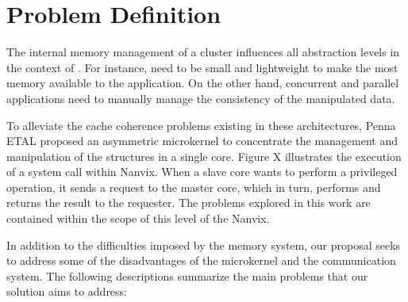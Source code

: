 \section{Problem Definition}
\label{sec:problem}

	The internal memory management of a cluster influences all abstraction
	levels in the context of \lws. For instance, \oses need to be small and
	lightweight to make the most memory available to the application. On the
	other hand, concurrent and parallel applications need to manually manage
	the consistency of the manipulated data.

	To alleviate the cache coherence problems existing in these architectures,
	Penna ETAL proposed an asymmetric microkernel to concentrate the management
	and manipulation of the \os structures in a single core. Figure
	X illustrates the execution of a system call within Nanvix. When a slave
	core wants to perform a privileged operation, it sends a request to the
	master core, which in turn, performs and returns the result to the
	requester. The problems explored in this work are contained within the
	scope of this level of the Nanvix.

	In addition to the difficulties imposed by the memory system, our proposal
	seeks to address some of the disadvantages of the microkernel and the
	communication system. The following descriptions summarize the main
	problems that our solution aims to address:

